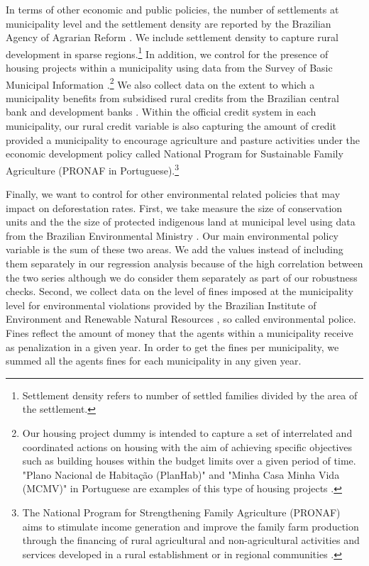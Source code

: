 In terms of other economic and public policies, the number of settlements at municipality level and the settlement density are reported by the Brazilian Agency of Agrarian Reform \citep{incrawebsite2}. We include settlement density to capture rural development in sparse regions.\footnote{Settlement density refers to  number of settled families divided by the area of the settlement.} In addition, we control for the presence of housing projects within a municipality using data from the Survey of Basic Municipal Information \citep{IBGE1}.\footnote{Our housing project dummy is intended to capture a set of interrelated and coordinated actions on housing with the aim of achieving specific objectives such as building houses within the budget limits over a given period of time. "Plano Nacional de Habitação (PlanHab)" and "Minha Casa Minha Vida (MCMV)" in Portuguese are examples of this type of housing projects \citep{Krause2013, KLINTOWITZ2016}.} We also collect data on the extent to which a municipality benefits from subsidised rural credits from the Brazilian central bank \citep{BCB} and development banks \citep{BNB,BASA}. Within the official credit system in each municipality, our rural credit variable is also capturing the amount of credit provided a municipality to encourage agriculture and pasture activities under the economic development policy called National Program for Sustainable Family Agriculture (PRONAF in Portuguese).\footnote{The National Program for Strengthening Family Agriculture (PRONAF) aims to stimulate income generation and improve the family farm production through the financing of rural agricultural and non-agricultural activities and services developed in a rural establishment or in regional communities \citep{PRONAF}.}

Finally, we want to control for other environmental related policies that may impact on deforestation rates.  First, we take measure the size of conservation units and the the size of protected indigenous land at municipal level using data from the Brazilian Environmental Ministry \citep{MMMAwebsite}.  Our main environmental policy variable is the sum of these two areas.  We add the values instead of including them separately in our regression analysis because of the high correlation between the two series although we do consider them separately as part of our robustness checks. Second, we collect data on the level of fines imposed at the municipality level for environmental violations provided by the Brazilian Institute of Environment and Renewable Natural Resources \citep{IBAMAwebsite}, so called environmental police.  Fines reflect the amount of money that the agents within a municipality receive as penalization in a given year. In order to get the fines per municipality, we summed all the agents fines for each municipality in any given year. 

